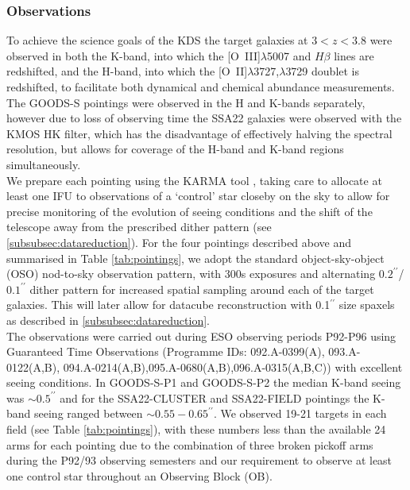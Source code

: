 \documentclass[fleqn,usenatbib]{mn2e}
\begin{document}
\subsubsection{Observations}\label{subsubsec:Obs}
To achieve the science goals of the KDS the target galaxies at $3 < z < 3.8$ were observed in both the K-band, into which the [O~{\sc III}]$\lambda$5007 and $H\beta$ lines are redshifted, and the H-band, into which the [O~{\sc II}]$\lambda$3727,$\lambda$3729 doublet is redshifted, to facilitate both dynamical and chemical abundance measurements.
The GOODS-S pointings were observed in the H and K-bands separately, however due to loss of observing time the SSA22 galaxies were observed with the KMOS HK filter, which has the disadvantage of effectively halving the spectral resolution, but allows for coverage of the H-band and K-band regions simultaneously. \\

We prepare each pointing using the KARMA tool \citep{Wegner2008}, taking care to allocate at least one IFU to observations of a `control' star closeby on the sky to allow for precise monitoring of the evolution of seeing conditions and the shift of the telescope away from the prescribed dither pattern (see \cref{subsubsec:datareduction}).
For the four pointings described above and summarised in Table \ref{tab:pointings}, we adopt the standard object-sky-object (OSO) nod-to-sky observation pattern, with 300s exposures and alternating $0.2^{\prime\prime}$/$0.1^{\prime\prime}$ dither pattern for increased spatial sampling around each of the target galaxies.
This will later allow for datacube reconstruction with 0.1$^{\prime\prime}$ size spaxels as described in \cref{subsubsec:datareduction}. \\

The observations were carried out during ESO observing periods P92-P96 using Guaranteed Time Observations (Programme IDs: 092.A-0399(A), 093.A-0122(A,B), 094.A-0214(A,B),095.A-0680(A,B),096.A-0315(A,B,C)) with excellent seeing conditions.
In GOODS-S-P1 and GOODS-S-P2 the median K-band seeing was $\sim 0.5^{\prime\prime}$ and for the SSA22-CLUSTER and SSA22-FIELD pointings the K-band seeing ranged between $\sim 0.55-0.65^{\prime\prime}$.
We observed 19-21 targets in each field (see Table \ref{tab:pointings}), with these numbers less than the available 24 arms for each pointing due to the combination of three broken pickoff arms during the P92/93 observing semesters and our requirement to observe at least one control star throughout an Observing Block (OB). \\
\end{document}
